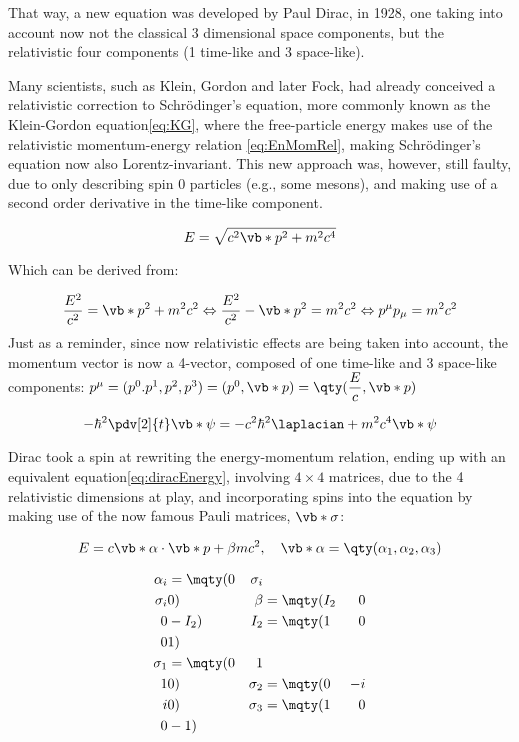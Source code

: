 That way, a new equation was developed by Paul Dirac, in 1928\cite{Dirac}, one taking into account now not the classical 3 dimensional space components, but the relativistic four components (1 time-like and 3 space-like).

Many scientists, such as Klein, Gordon and later Fock, had already conceived a relativistic correction to Schrödinger's equation, more commonly known as the Klein-Gordon equation\eqref{eq:KG}, where the free-particle energy makes use of the relativistic momentum-energy relation \eqref{eq:EnMomRel}, making Schrödinger's equation now also Lorentz-invariant.
 This new approach was, however, still faulty, due to only describing spin 0 particles (e.g., some mesons), and making use of a second order derivative in the time-like component.

 \begin{equation}
    E=\sqrt{c^2\vb*{p}^2+m^2c^4}
    \label{eq:EnMomRel}
 \end{equation}

Which can be derived from:

 \begin{equation}
    \dfrac{E^2}{c^2}= \vb*{p}^2 +m^2c^2 \Leftrightarrow \dfrac{E^2}{c^2}-\vb*{p}^2=m^2c^2\Leftrightarrow p^\mu p_\mu = m^2c^2
 \end{equation}
 Just as a reminder, since now relativistic effects are being taken into account, the momentum vector is now a 4-vector, composed of one time-like and 3 space-like components: $p^\mu=(p^0.p^1,p^2,p^3)=(p^0,\vb*{p})=\qty(\dfrac{E}{c},\vb*{p})$

 \begin{equation}
    -\hbar^2 \pdv[2]{t} \vb*{\psi}=-c^2\hbar^2\laplacian + m^2c^4\vb*{\psi}
    \label{eq:KG}
\end{equation}

 Dirac took a spin at rewriting the energy-momentum relation, ending up with an equivalent equation\eqref{eq:diracEnergy}, involving $4\times 4$ matrices, due to the 4 relativistic dimensions at play, and incorporating spins into the equation by making use of the now famous Pauli matrices, $\vb*{\sigma}$:

 \begin{equation}
    E=c\vb*{\alpha}\cdot \vb*{p}+{\beta} mc^2,\quad \vb*{\alpha}=\qty(\alpha_1,\alpha_2,\alpha_3)
    \label{eq:diracEnergy}
 \end{equation}

 \begin{align}
    \alpha_i&=\mqty(0 & {\sigma}_i\\ {\sigma}_i&0) & {\beta}&=\mqty(I_2 & 0 \\ 0 &-I_2) &I_2&=\mqty(1&0\\0&1)\\
    \sigma_1&=\mqty(0&1\\1&0) & \sigma_2&=\mqty(0&-i\\i&0)& \sigma_3&=\mqty(1&0\\0&-1)
 \end{align}

